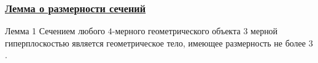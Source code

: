 \documentclass[10pt,pdf,hyperref={unicode}]{beamer}
\begin{document}
\begin{frame}
	\frametitle{\hyperlink{basis}{Лемма о размерности сечений}}
	\hypertarget{basis_back}{}

{\small
	\begin{block}{Лемма 1}
		Сечением любого $4$-мерного геометрического объекта $3$ мерной гиперплоскостью является геометрическое тело, имеющее размерность не более $3$. 
	\end{block}
}
	\begin{columns}
	\end{columns}
\end{frame}
\end{document}
